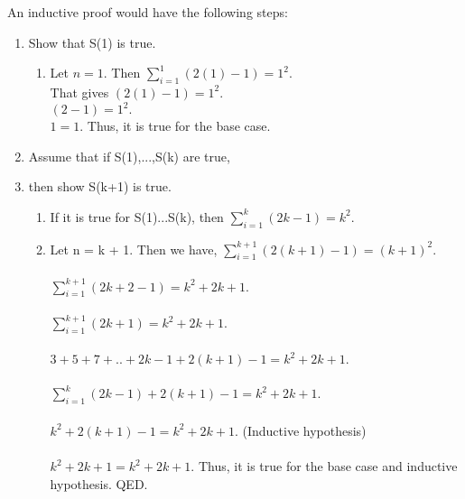 \documentclass[12pt]{article}
\begin{document}
\begin{enumerate}
An inductive proof would have the following steps:
\begin{enumerate}
	\item  Show that S(1) is true.
     	 	\begin{enumerate}
     	\item Let $n = 1.$ Then $\sum_{i = 1}^{1}(2(1)-1) = 1^2.$\\ 
     	That gives $(2(1)-1) = 1^2.$\\ $(2-1) = 1^2.$\\ $1 = 1.$ Thus, it is true for the base case.\\	
     \end{enumerate}
     \item Assume that if S(1),...,S(k) are true, 
     \item then show S(k+1) is true.
     \begin{enumerate}
     	\item If it is true for S(1)...S(k), then $\sum_{i = 1}^{k}(2k-1) = k^2.$\\ 
     	\item Let n = k + 1. Then we have, $\sum_{i = 1}^{k+1}(2(k+1)-1) = (k+1)^2.$\\\\ $\sum_{i = 1}^{k+1}(2k+2-1) = k^2 + 2k + 1.$\\\\ $\sum_{i = 1}^{k+1}(2k+1) = k^2 + 2k + 1.$\\\\ $3 + 5 + 7 + .. + 2k-1 + 2(k+1)-1 = k^2 + 2k + 1.$\\\\ $\sum_{i = 1}^{k}(2k-1) + 2(k+1)-1 = k^2 + 2k + 1.$\\\\
     	$k^2 + 2(k+1)-1 = k^2 + 2k + 1.$ (Inductive hypothesis)\\\\ 
     	$k^2 + 2k + 1 = k^2 + 2k + 1.$ Thus, it is true for the base case and inductive hypothesis. QED.
     \end{enumerate}
\end{enumerate}


\end{enumerate}
\end{document}
